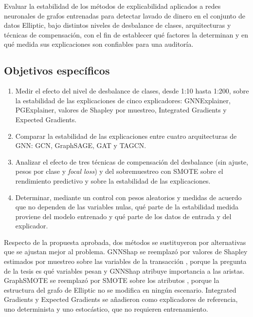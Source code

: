 Evaluar la estabilidad de los métodos de explicabilidad aplicados a redes neuronales de grafos
entrenadas para detectar lavado de dinero en el conjunto de datos Elliptic, bajo distintos
niveles de desbalance de clases, arquitecturas y técnicas de compensación, con el fin de
establecer qué factores la determinan y en qué medida sus explicaciones son confiables para
una auditoría.

\subsection{Objetivos específicos}

\begin{enumerate}
  \item Medir el efecto del nivel de desbalance de clases, desde 1:10 hasta 1:200, sobre la
        estabilidad de las explicaciones de cinco explicadores: GNNExplainer, PGExplainer,
        valores de Shapley por muestreo, Integrated Gradients y Expected Gradients.
  \item Comparar la estabilidad de las explicaciones entre cuatro arquitecturas de GNN: GCN,
        GraphSAGE, GAT y TAGCN.
  \item Analizar el efecto de tres técnicas de compensación del desbalance (sin ajuste, pesos
        por clase y \textit{focal loss}) y del sobremuestreo con SMOTE sobre el rendimiento
        predictivo y sobre la estabilidad de las explicaciones.
  \item Determinar, mediante un control con pesos aleatorios y medidas de acuerdo que no
        dependen de las variables nulas, qué parte de la estabilidad medida proviene del modelo
        entrenado y qué parte de los datos de entrada y del explicador.
\end{enumerate}

Respecto de la propuesta aprobada, dos métodos se sustituyeron por alternativas que se ajustan
mejor al problema. GNNShap se reemplazó por valores de Shapley
estimados por muestreo sobre las variables de la transacción \cite{Strumbelj2014Explaining},
porque la pregunta de la tesis es qué variables pesan y GNNShap atribuye importancia a las
aristas. GraphSMOTE se reemplazó por SMOTE sobre los atributos \cite{Chawla2002SMOTE}, porque
la estructura del grafo de Elliptic no se modifica en ningún escenario. Integrated Gradients
\cite{Sundararajan2017IG} y Expected Gradients \cite{Erion2021Expected} se añadieron como
explicadores de referencia, uno determinista y uno estocástico, que no requieren entrenamiento.

